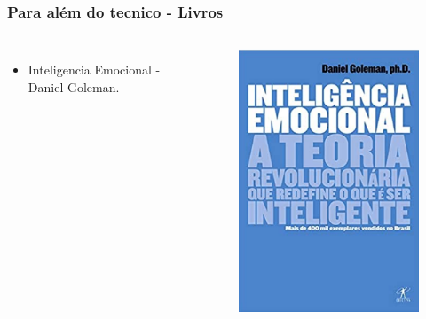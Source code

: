 \documentclass[    
  12pt, 
  compress,
  aspectratio=169,
  blue
  ]{beamer}
\begin{document}
\begin{frame}
\frametitle{ Para além do tecnico - Livros}   
\begin{columns}[c]
\begin{itemize}
\item<1-> Inteligencia Emocional - Daniel Goleman.
\end{itemize}
\centering
\begin{figure}
\includegraphics[scale=0.5]{inteligencia}
\end{figure}
\end{columns}
\end{frame}
\end{document}
